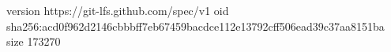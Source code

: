 version https://git-lfs.github.com/spec/v1
oid sha256:acd0f962d2146cbbbff7eb67459bacdce112e13792cff506ead39c37aa8151ba
size 173270
